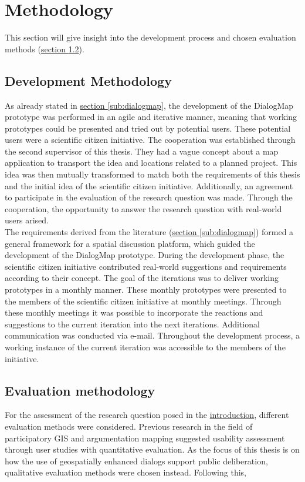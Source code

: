 \section{Methodology}
\label{chap:methodology}
This section will give insight into the development process and chosen evaluation methods (\hyperref[subchap:ev_methodology]{section \ref{subchap:ev_methodology}}).

\subsection{Development Methodology}
As already stated in \hyperref[sub:dialogmap]{section \ref{sub:dialogmap}}, the development of the DialogMap prototype was performed in an agile and iterative manner, meaning that working prototypes could be presented and tried out by potential users. These potential users were a scientific citizen initiative. The cooperation was established through the second supervisor of this thesis. They had a vague concept about a map application to transport the idea and locations related to a planned project. This idea was then mutually transformed to match both the requirements of this thesis and the initial idea of the scientific citizen initiative. Additionally, an agreement to participate in the evaluation of the research question was made. Through the cooperation, the opportunity to answer the research question with real-world users arised.\\
The requirements derived from the literature (\hyperref[sub:dialogmap]{section \ref{sub:dialogmap}}) formed a general framework for a spatial discussion platform, which guided the development of the DialogMap prototype. During the development phase, the scientific citizen initiative contributed real-world suggestions and requirements according to their concept. The goal of the iterations was to deliver working prototypes in a monthly manner. These monthly prototypes were presented to the members of the scientific citizen initiative at monthly meetings. Through these monthly meetings it was possible to incorporate the reactions and suggestions to the current iteration into the next iterations. Additional communication was conducted via e-mail. Throughout the development process, a working instance of the current iteration was accessible to the members of the initiative.\\

\subsection{Evaluation methodology}
\label{subchap:ev_methodology}
For the assessment of the research question posed in the \hyperref[chap:introduction]{introduction}, different evaluation methods were considered. Previous research in the field of participatory GIS and argumentation mapping suggested usability assessment through user studies with quantitative evaluation. As the focus of this thesis is on how the use of geospatially enhanced dialogs support public deliberation, qualitative evaluation methods were chosen instead. Following this, 


